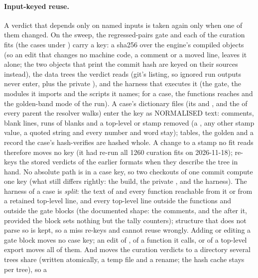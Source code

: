 \documentclass[11pt,a4paper]{article}
\begin{document}
\paragraph{Input-keyed reuse.}  A verdict that depends only on named inputs is
taken again only when one of them changed.  On the sweep, the regressed-pairs
gate and each of the curation fits (the cases under )
carry a key: a sha256 over the engine's compiled objects (so an edit that
changes no machine code, a comment or a moved line, leaves it alone; the two
objects that print the commit hash are keyed on their sources instead), the
data trees the verdict reads (git's listing, so ignored run outputs never
enter, plus the private ), and the harness that executes it
(the gate, the  modules it imports and the scripts it names;
for a case, the  functions  reaches and
the golden-band mode of the run).  A case's dictionary files (its 
and , and the  of every parent the resolver
walks) enter the key as NORMALISED text: comments, blank lines, runs of blanks
and a top-level  or  stamp removed (a
, any other stamp value, a quoted string and every number and
word stay); tables, the  golden and a record the case's
 hash-verifies are hashed whole.  A change to a stamp no
fit reads therefore moves no key (it had re-run all 1260 curation fits on
2026-11-18);  re-keys the stored verdicts of
the earlier formats when they describe the tree in hand.  No absolute path
is in a case key, so two checkouts of one commit compute one key (what still
differs rightly: the build, the private , and the harness).
The harness of a case is  \emph{split}: the text of
 and every function reachable from it or from a retained
top-level line, and every top-level line outside the functions and outside the
gate blocks (the documented shape: the comments, 
and the  after it, provided the block sets nothing but the tally
counters); structure that does not parse so is kept, so a miss re-keys and
cannot reuse wrongly.  Adding or editing a gate block moves no case key; an
edit of , of a function it calls, or of a top-level export
moves all of them.  And 
moves the curation verdicts to a directory several trees share (written
atomically, a temp file and a rename; the hash cache stays per tree), so a
\end{document}
